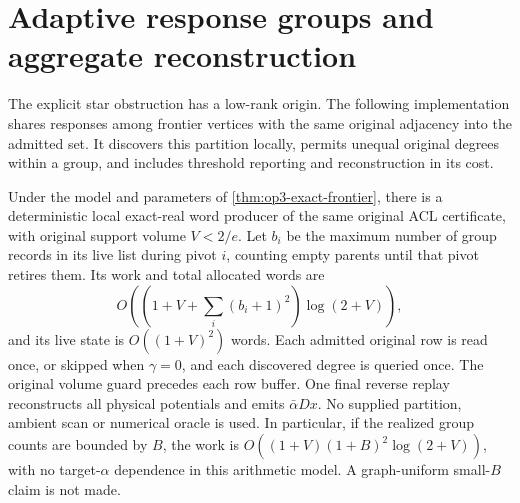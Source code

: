 \section{Adaptive response groups and aggregate reconstruction}
\label{sec:op3-frontier-response-groups}

The explicit star obstruction has a low-rank origin. The following
implementation shares responses among frontier vertices with the same
original adjacency into the admitted set. It discovers this partition
locally, permits unequal original degrees within a group, and includes
threshold reporting and reconstruction in its cost.

\begin{theorem}
\label{thm:op3-frontier-response-groups}
Under the model and parameters of \cref{thm:op3-exact-frontier}, there is
a deterministic local exact-real word producer of the same original ACL
certificate, with original support volume $V<2/e$. Let $b_i$ be the maximum
number of group records in its live list during pivot $i$, counting empty
parents until that pivot retires them. Its work and total allocated words
are
\[
 O\left(\left(1+V+\sum_i(b_i+1)^2\right)\log(2+V)\right),
\]
and its live state is $O((1+V)^2)$ words. Each admitted original row is read
once, or skipped when $\gamma=0$, and each discovered degree is queried
once. The original volume guard precedes each row buffer. One final reverse
replay reconstructs all physical potentials and emits $\bar\alpha Dx$.
No supplied partition, ambient scan or numerical oracle is used. In
particular, if the realized group counts are bounded by $B$, the work is
$O((1+V)(1+B)^2\log(2+V))$, with no target-$\alpha$ dependence in this
arithmetic model. A graph-uniform small-$B$ claim is not made.
\end{theorem}
